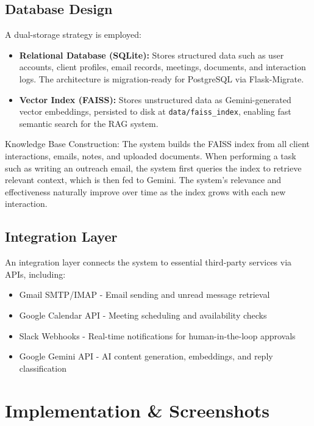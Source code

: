 \documentclass[12pt,a4paper]{report}
\begin{document}
\section{Database Design}
A dual-storage strategy is employed:

\begin{itemize}
    \item \textbf{Relational Database (SQLite):} Stores structured data such as user accounts, client profiles, email records, meetings, documents, and interaction logs. The architecture is migration-ready for PostgreSQL via Flask-Migrate.
    \item \textbf{Vector Index (FAISS):} Stores unstructured data as Gemini-generated vector embeddings, persisted to disk at \texttt{data/faiss_index}, enabling fast semantic search for the RAG system.
\end{itemize}

Knowledge Base Construction: The system builds the FAISS index from all client interactions, emails, notes, and uploaded documents. When performing a task such as writing an outreach email, the system first queries the index to retrieve relevant context, which is then fed to Gemini. The system's relevance and effectiveness naturally improve over time as the index grows with each new interaction.

\section{Integration Layer}
An integration layer connects the system to essential third-party services via APIs, including:

\begin{itemize}
    \item Gmail SMTP/IMAP - Email sending and unread message retrieval
    \item Google Calendar API - Meeting scheduling and availability checks
    \item Slack Webhooks - Real-time notifications for human-in-the-loop approvals
    \item Google Gemini API - AI content generation, embeddings, and reply classification
\end{itemize}

\chapter{Implementation \& Screenshots}
\end{document}
